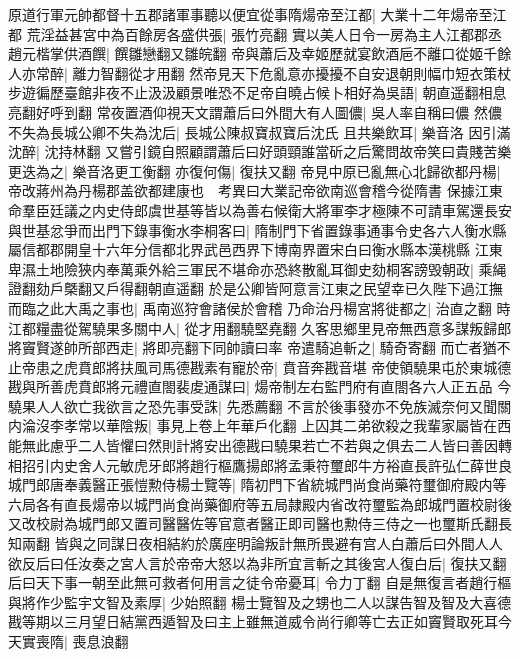 原道行軍元帥都督十五郡諸軍事聽以便宜從事隋煬帝至江都|{
	大業十二年煬帝至江都}
荒淫益甚宮中為百餘房各盛供張|{
	張竹亮翻}
實以美人日令一房為主人江都郡丞趙元楷掌供酒饌|{
	饌雛戀翻又雛皖翻}
帝與蕭后及幸姬歷就宴飲酒巵不離口從姬千餘人亦常醉|{
	離力智翻從才用翻}
然帝見天下危亂意亦擾擾不自安退朝則幅巾短衣策杖步遊徧歷臺館非夜不止汲汲顧景唯恐不足帝自曉占候卜相好為吳語|{
	朝直遥翻相息亮翻好呼到翻}
常夜置酒仰視天文謂蕭后曰外間大有人圖儂|{
	吳人率自稱曰儂}
然儂不失為長城公卿不失為沈后|{
	長城公陳叔寶叔寶后沈氏}
且共樂飲耳|{
	樂音洛}
因引滿沈醉|{
	沈持林翻}
又嘗引鏡自照顧謂蕭后曰好頭頸誰當斫之后驚問故帝笑曰貴賤苦樂更迭為之|{
	樂音洛更工衡翻}
亦復何傷|{
	復扶又翻}
帝見中原已亂無心北歸欲都丹楊|{
	帝改蔣州為丹楊郡盖欲都建康也　考異曰大業記帝欲南巡會稽今從隋書}
保據江東命羣臣廷議之内史侍郎虞世基等皆以為善右候衛大將軍李才極陳不可請車駕還長安與世基忿爭而出門下錄事衡水李桐客曰|{
	隋制門下省置錄事通事令史各六人衡水縣屬信都郡開皇十六年分信都北界武邑西界下博南界置宋白曰衡水縣本漢桃縣}
江東卑濕土地險狹内奉萬乘外給三軍民不堪命亦恐終散亂耳御史劾桐客謗毁朝政|{
	乘䋲證翻劾戶槩翻又戶得翻朝直遥翻}
於是公卿皆阿意言江東之民望幸已久陛下過江撫而臨之此大禹之事也|{
	禹南巡狩會諸侯於會稽}
乃命治丹楊宮將徙都之|{
	治直之翻}
時江都糧盡從駕驍果多關中人|{
	從才用翻驍堅堯翻}
久客思鄉里見帝無西意多謀叛歸郎將竇賢遂帥所部西走|{
	將即亮翻下同帥讀曰率}
帝遣騎追斬之|{
	騎奇寄翻}
而亡者猶不止帝患之虎賁郎將扶風司馬德戡素有寵於帝|{
	賁音奔戡音堪}
帝使領驍果屯於東城德戡與所善虎賁郎將元禮直閤裴䖍通謀曰|{
	煬帝制左右監門府有直閤各六人正五品}
今驍果人人欲亡我欲言之恐先事受誅|{
	先悉薦翻}
不言於後事發亦不免族滅奈何又聞關内淪沒李孝常以華陰叛|{
	事見上卷上年華戶化翻}
上囚其二弟欲殺之我輩家屬皆在西能無此慮乎二人皆懼曰然則計將安出德戡曰驍果若亡不若與之俱去二人皆曰善因轉相招引内史舍人元敏虎牙郎將趙行樞鷹揚郎將孟秉符璽郎牛方裕直長許弘仁薛世良城門郎唐奉義醫正張愷勲侍楊士覽等|{
	隋初門下省統城門尚食尚藥符璽御府殿内等六局各有直長煬帝以城門尚食尚藥御府等五局隷殿内省改符璽監為郎城門置校尉後又改校尉為城門郎又置司醫醫佐等官意者醫正即司醫也勲侍三侍之一也璽斯氏翻長知兩翻}
皆與之同謀日夜相結約於廣座明論叛計無所畏避有宫人白蕭后曰外間人人欲反后曰任汝奏之宮人言於帝帝大怒以為非所宜言斬之其後宮人復白后|{
	復扶又翻}
后曰天下事一朝至此無可救者何用言之徒令帝憂耳|{
	令力丁翻}
自是無復言者趙行樞與將作少監宇文智及素厚|{
	少始照翻}
楊士覽智及之甥也二人以謀告智及智及大喜德戡等期以三月望日結黨西遁智及曰主上雖無道威令尚行卿等亡去正如竇賢取死耳今天實喪隋|{
	喪息浪翻}
